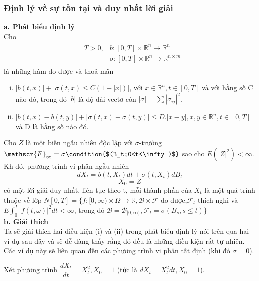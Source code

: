 \documentclass[14pt,a4paper]{article}
\numberwithin{equation}{section}
\begin{document}
\subsubsection{Định lý về sự tồn tại và duy nhất lời giải}
\textbf{a. Phát biểu định lý}\\
Cho
\begin{align}
	& \begin{aligned}
	T>0,& b:[0,T]\times\mathbb{R}^n\rightarrow\mathbb{R}^n\\
	& \sigma:[0,T]\times\mathbb{R}^n\rightarrow\mathbb{R}^{n\times m}
\end{aligned}
\end{align}
là những hàm đo được và thoả mãn
\begin{enumerate}[(i)]
	\item $|b(t,x)|+|\sigma(t,x)\leq C(1+|x|)|$, với $x\in\mathbb{R}^n,t\in[0,T]$ và với hằng số C nào đó, trong đó $|b|$ là độ dài vectơ còn $|\sigma|=\sum{|\sigma_{ij}|^2}$.
	\item $|b(t,x)-b(t,y)|+|\sigma(t,x)-\sigma(t,y)|\leq D.|x-y|,x,y\in\mathbb{R}^n,t\in[0,T]$ và D là hằng số nào đó.
\end{enumerate}
Cho $Z$ là một biến ngẫu nhiên độc lập với $\sigma$-trường $\mathscr{F}_\infty=\sigma \condition{$(B_t;0<t<\infty)$}$ sao cho $E(|Z|^2)<\infty$. Kh đó, phương trình vi phân ngẫu nhiên
\begin{equation*}
	dX_t=b(t,X_t)dt+\sigma(t,X_t)dB_t \tag{PT}
\end{equation*}
\begin{equation*}
	X_0=Z
\end{equation*}
có một lời giải duy nhất, liên tục theo t, mỗi thành phần của $X_t$ là một quá trình thuộc về lớp $N[0,T]=\{f:[0,\infty)\times\Omega\rightarrow\mathbb{R},\mathscr{B}\times\mathscr{F}$-đo được,$\mathscr{F}_t$-thích nghi và $E\int_0^T|f(t,\omega)|^2dt<\infty$, trong đó $\mathscr{B}=\mathscr{B}_{[0,\infty)},\mathscr{F}_t=\sigma(B_s,s\leq t)\}$\\
\indent\textbf{b. Giải thích}\\
Ta sẽ giải thích hai điều kiện (i) và (ii) trong phát biểu định lý nói trên qua hai ví dụ sau đây và sẽ dễ dàng thấy rằng đó đều là những điều kiện rất tự nhiên. Các ví dụ này sẽ liên quan đến các phương trình vi phân tất định (khi đó $\sigma=0$).\\
\begin{example}
Xét phương trình $\dfrac{dX_t}{dt}=X^2_t,X_0=1$ (tức là $dX_t=X_t^2dt,X_0=1$).	
\end{example}
\end{document}
